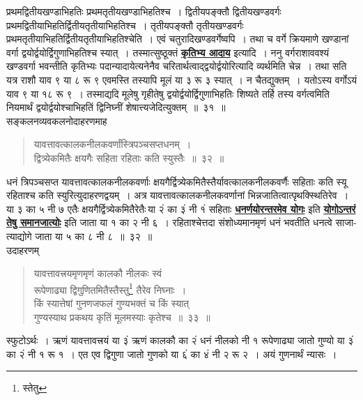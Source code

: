 \documentclass[11pt, openany]{book}
\begin{document}
प्रथमद्वितीयखण्डाभिहतिः प्रथमतृतीयखण्डाभिहतिश्च~। द्वितीयपङ्क्तौ द्वितीयखण्डवर्गः
प्रथमद्वितीयाभिहतिर्द्वितीयतृतीयाभिहतिश्च~। तृतीयपङ्क्तौ तृतीयखण्डवर्गः
प्रथमतृतीयाभिहतिर्द्वितीयतृतीयाभिहतिश्चेति~। एवं चतुरादिखण्डवर्गेष्वपि~।
तथा च वर्गे क्रियमाणे खण्डानां वर्गा द्वयोर्द्वयोर्द्विगुणाभिहतिश्च स्यात्~।
तस्मात्सुष्ठूक्तं \hyperref[31]{\textbf{कृतिभ्य आदाय}} इत्यादि~। ननु वर्गराशाववश्यं खण्डवर्गा भवन्तीति
कृतिभ्यः पदान्यादायेत्यनेनैव चरितार्थत्वाद्द्वयोर्द्वयोरित्यादि
व्यर्थमिति चेन्न~। तथा सति यत्र राशौ याव ९ या ८ रू ९ एवमस्ति तस्यापि
मूलं या ३ रू ३ स्यात्~। न चैतद्युक्तम्~। यतोऽस्य वर्गोऽयं याव ९ या १८ रू ९~। तस्माद्यदि मूलेषु
\newpage
\noindent गृहीतेषु द्वयोर्द्वयोर्द्विगुणाभिहतिः शिष्यते तर्हि तस्य वर्गत्वमिति
नियमार्थं द्वयोर्द्वयोश्चाभिहतिं द्विनिघ्नीं शेषात्त्यजेदित्युक्तम्~॥~३१~॥\\

\vspace{-2mm}
{\bqt सङ्कलनव्यवकलनोदाहरणमाह\textendash }
\begin{quote}
    \eg
    यावत्तावत्कालकनीलकवर्णांस्त्रिपञ्चसप्तधनम्~।\\
द्वित्र्येकमितैः क्षयगैः सहिता रहिताः कति स्युस्तैः~॥~३२~॥
\end{quote}

धनं त्रिपञ्चसप्त यावत्तावत्कालकनीलकवर्णाः क्षयगैर्द्वित्र्येकमितैस्तैर्यावत्कालकनीलकवर्णैः सहिताः कति स्यू रहिताश्च कति स्युरित्युदाहरणद्वयम्~। अत्र यावत्तावत्कालकनीलकवर्णानां
भिन्नजातित्वात्पृथक्स्थितिरेव~। या ३ का ५ नी ७ एतैः
क्षयगैर्द्वित्र्येकमितैरेतैः\textendash \,या २ं का ३ं नी १ं सहिताः 
\hyperref[3]{\textbf{धनर्णयोरन्तरमेव योगः}} इति \hyperref[22]{\textbf{योगोऽन्तरं तेषु समानजात्योः}} इति जाता या १ 
का २ नी ६~। रहिताश्चेत्तदा संशोध्यमानमृणं धनं भवतीति धनत्वे
साजा-त्याद्योगे जाता या ५ का ८ नी ८~॥~३२~॥\\

\vspace{-2mm}
{\bqt उदाहरणम् }
\begin{quote}
    \eg
    यावत्तावत्त्रयमृणमृणं कालकौ नीलकः स्वं \\
रूपेणाढ्या द्विगुणितमितैस्तैस्तु\renewcommand{\thefootnote}{1}\footnote{स्तेतु} तैरेव निघ्नाः~। \\
किं स्यात्तेषां गुनणजफलं गुण्यभक्तं च किं स्यात्\\
गुण्यस्याथ प्रकथय कृतिं मूलमस्याः कृतेश्च~॥~३३~॥
\end{quote}

स्फुटोऽर्थः~। ऋणं यावत्तावत्त्रयं या ३ं ऋणं कालकौ का २ं धनं नीलको
नी १ रूपेणाढ्या जातो गुण्यो या ३ं का २ं नी १ रू १~। एत एव
द्विगुणा जातो गुणको या ६ं का ४ं नी २ रू २~। अयं गुणनार्थं न्यासः~।
\end{document}

